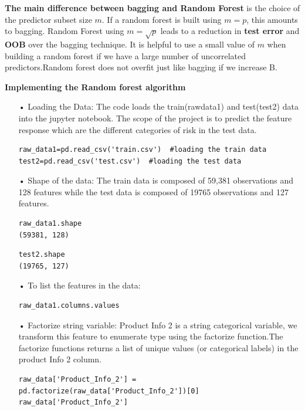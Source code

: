\textbf{The main difference between bagging and Random Forest} is the choice of the predictor subset size $m$. If a random forest is built using $m=p$, this amounts to bagging. Random Forest using $m=\sqrt{p}$ leads to a reduction in \textbf{test error} and \textbf{OOB} over the bagging technique. It is helpful to use a small value of $m$ when building a random forest if we have a large number of uncorrelated predictors.Random forest does not overfit just like bagging if we increase B.

\begin{center}
\textbf{Implementing the Random forest algorithm}
\end{center}

\begin{enumerate}
\item[•] Loading the Data: The code loads the train(rawdata1) and test(test2) data into the jupyter notebook. The scope of the project is to predict the feature response which are the different categories of risk in the test data.

\begin{verbatim}
raw_data1=pd.read_csv('train.csv')  #loading the train data
test2=pd.read_csv('test.csv')  #loading the test data
\end{verbatim}

\item[•] Shape of the data: The train data is composed of 59,381 observations and 128 features while the test data is composed of 19765 observations and 127 features.

\begin{verbatim}
raw_data1.shape
(59381, 128)
\end{verbatim}

\begin{verbatim}
test2.shape
(19765, 127)
\end{verbatim}

\item[•] To list the features in the data:
\begin{verbatim}
raw_data1.columns.values
\end{verbatim}

\item[•] Factorize string variable: Product Info 2 is a string categorical variable, we transform this feature to enumerate type using the factorize function.The factorize functions returns a list of unique values (or categorical labels) in the product Info 2 column.
\begin{verbatim}
raw_data['Product_Info_2'] = pd.factorize(raw_data['Product_Info_2'])[0]  
raw_data['Product_Info_2']
\end{verbatim}


\end{enumerate}

